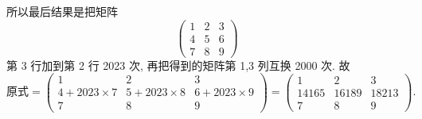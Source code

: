 \documentclass[../../main.tex]{subfiles}%
\begin{document}
\begin{solution}
所以最后结果是把矩阵
\[
\begin{pmatrix} 
1 & 2 & 3 \\
4 & 5 & 6 \\
7 & 8 & 9 
\end{pmatrix}
\]
第 3 行加到第 2 行 2023 次, 再把得到的矩阵第 1,3 列互换 2000 次. 故
\[
\text{原式} = \begin{pmatrix} 
1 & 2 & 3 \\
4 + 2023 \times 7 & 5 + 2023 \times 8 & 6 + 2023 \times 9 \\
7 & 8 & 9 
\end{pmatrix} = \begin{pmatrix} 
1 & 2 & 3 \\
14165 & 16189 & 18213 \\
7 & 8 & 9 
\end{pmatrix}.
\]

\end{solution}
\end{document}
